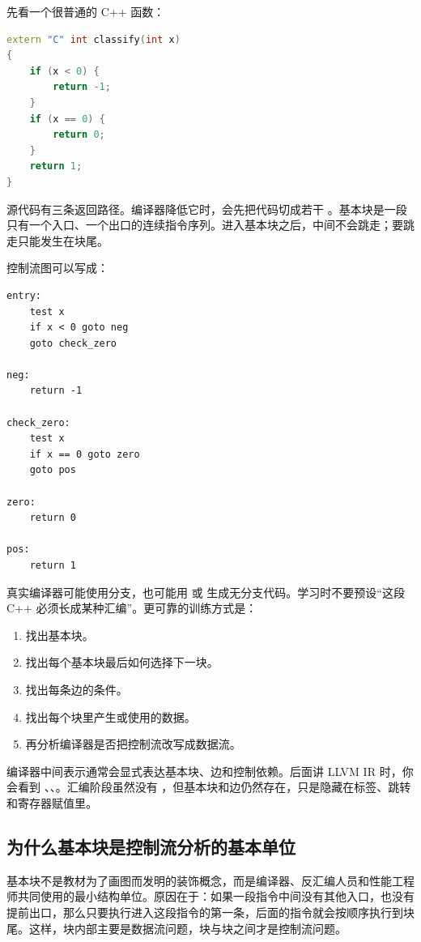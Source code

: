 先看一个很普通的 C++ 函数：

\begin{lstlisting}[language=C++]
extern "C" int classify(int x)
{
    if (x < 0) {
        return -1;
    }
    if (x == 0) {
        return 0;
    }
    return 1;
}
\end{lstlisting}

源代码有三条返回路径。编译器降低它时，会先把代码切成若干 。基本块是一段只有一个入口、一个出口的连续指令序列。进入基本块之后，中间不会跳走；要跳走只能发生在块尾。

控制流图可以写成：

\begin{lstlisting}
entry:
    test x
    if x < 0 goto neg
    goto check_zero

neg:
    return -1

check_zero:
    test x
    if x == 0 goto zero
    goto pos

zero:
    return 0

pos:
    return 1
\end{lstlisting}

真实编译器可能使用分支，也可能用  或  生成无分支代码。学习时不要预设“这段 C++ 必须长成某种汇编”。更可靠的训练方式是：

\begin{enumerate}
  \item 找出基本块。
  \item 找出每个基本块最后如何选择下一块。
  \item 找出每条边的条件。
  \item 找出每个块里产生或使用的数据。
  \item 再分析编译器是否把控制流改写成数据流。
\end{enumerate}

\begin{deepdive}
编译器中间表示通常会显式表达基本块、边和控制依赖。后面讲 LLVM IR 时，你会看到 、、。汇编阶段虽然没有 ，但基本块和边仍然存在，只是隐藏在标签、跳转和寄存器赋值里。
\end{deepdive}

\subsection{为什么基本块是控制流分析的基本单位}

基本块不是教材为了画图而发明的装饰概念，而是编译器、反汇编人员和性能工程师共同使用的最小结构单位。原因在于：如果一段指令中间没有其他入口，也没有提前出口，那么只要执行进入这段指令的第一条，后面的指令就会按顺序执行到块尾。这样，块内部主要是数据流问题，块与块之间才是控制流问题。

